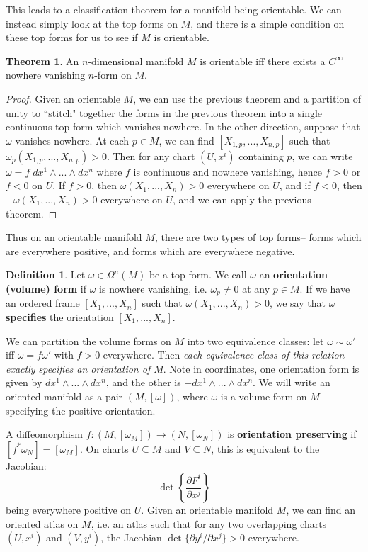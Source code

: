 \documentclass[11pt, oneside]{article}   	%
\theoremstyle{definition}
\newtheorem{definition}{Definition}[section]
\newtheorem{theorem}{Theorem}[section]
\begin{document}
This leads to a classification theorem for a manifold being orientable. We can instead simply look at the top forms on $M$, 
and there is a simple condition on these top forms for us to see if $M$ is orientable.
\begin{theorem}
	An $n$-dimensional manifold $M$ is orientable iff there exists a $C^\infty$ nowhere vanishing $n$-form on $M$. 
\end{theorem}
\begin{proof}
Given an orientable $M$, we can use the previous theorem and a partition of unity to ``stitch" together 
the forms in the previous theorem into a single continuous top form which vanishes nowhere. In the other direction, 
suppose that $\omega$ vanishes nowhere. At each $p\in M$, we can find $[X_{1, p}, ..., X_{n, p}]$ such that $\omega_p
(X_{1, p}, ..., X_{n, p}) > 0$. Then for any chart $(U, x^i)$ containing $p$, we can write $\omega = f\;dx^1\wedge ...\wedge 
dx^n$ where $f$ is continuous and nowhere vanishing, hence $f > 0$ or $f < 0$ on $U$. If $f > 0$, then $\omega(X_1, ..., 
X_n) > 0$ everywhere on $U$, and if $f < 0$, then $-\omega(X_1, ..., X_n) > 0$ everywhere on $U$, and we can 
apply the previous theorem.
\end{proof}
Thus on an orientable manifold $M$, there are two types of top forms-- forms which are everywhere positive, and forms which 
are everywhere negative. 
\begin{definition}
	Let $\omega\in\Omega^n(M)$ be a top form. We call $\omega$ an \textbf{orientation (volume) form} if $\omega$ is 
	nowhere vanishing, i.e. $\omega_p\neq 0$ at any $p\in M$. If we have an ordered frame $[X_1, ..., X_n]$ such that 
	$\omega(X_1, ..., X_n) > 0$, we say that $\omega$ \textbf{specifies} the orientation $[X_1, ..., X_n]$. 
\end{definition}
We can partition the volume forms on $M$ into two equivalence classes: let $\omega\sim\omega'$ iff $\omega = f\omega'$ 
with $f > 0$ everywhere. Then \textit{each equivalence class of this relation exactly specifies an orientation of $M$}. 
Note in coordinates, one orientation form is given by $dx^1\wedge ...\wedge dx^n$, and the other is $-dx^1\wedge ...
\wedge dx^n$. We will write an oriented manifold as a pair $(M, [\omega])$, where $\omega$ is a volume form on $M$ 
specifying the positive orientation. 

A diffeomorphism $f : (M, [\omega_M])\rightarrow (N, [\omega_N])$ is \textbf{orientation preserving} if $[f^*\omega_N] = 
[\omega_M]$. On charts $U\subseteq M$ and $V\subseteq N$, this is equivalent to the Jacobian:
\begin{equation}
	\det\left\{\frac{\partial F^i}{\partial x^j}\right\}
\end{equation}
being everywhere positive on $U$. Given an orientable manifold $M$, we can find an oriented atlas on $M$, i.e. an atlas 
such that for any two overlapping charts $(U, x^i)$ and $(V, y^i)$, the Jacobian $\det\{\partial y^i / \partial x^j\} > 0$ 
everywhere. 
\end{document}
